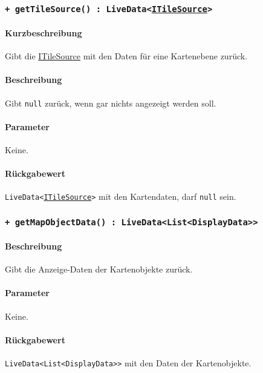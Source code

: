 \subsubsection*{\texttt{+ getTileSource() : LiveData<\href{https://osmdroid.github.io/osmdroid/javadocAll/org/osmdroid/tileprovider/tilesource/ITileSource.html}{ITileSource}>}}\label{App_Map_ViewModel_getTileSource}%
\paragraph*{Kurzbeschreibung}
Gibt die \href{https://osmdroid.github.io/osmdroid/javadocAll/org/osmdroid/tileprovider/tilesource/ITileSource.html}
{ITileSource} mit den Daten für eine Kartenebene zurück.
\paragraph*{Beschreibung}
Gibt \texttt{null} zurück, wenn gar nichts angezeigt werden soll.
\paragraph*{Parameter}
Keine.
\paragraph*{Rückgabewert}
\texttt{LiveData<\href{https://osmdroid.github.io/osmdroid/javadocAll/org/osmdroid/tileprovider/tilesource/ITileSource.html}
{ITileSource}>} mit den Kartendaten, darf \texttt{null} sein.

\subsubsection*{\texttt{+ getMapObjectData() : LiveData<List<DisplayData>>}}\label{App_Map_ViewModel_getMapObjectData}%
\paragraph*{Beschreibung}
Gibt die Anzeige-Daten der Kartenobjekte zurück.
\paragraph*{Parameter}
Keine.
\paragraph*{Rückgabewert}
\texttt{LiveData<List<DisplayData>>} mit den Daten der Kartenobjekte.


